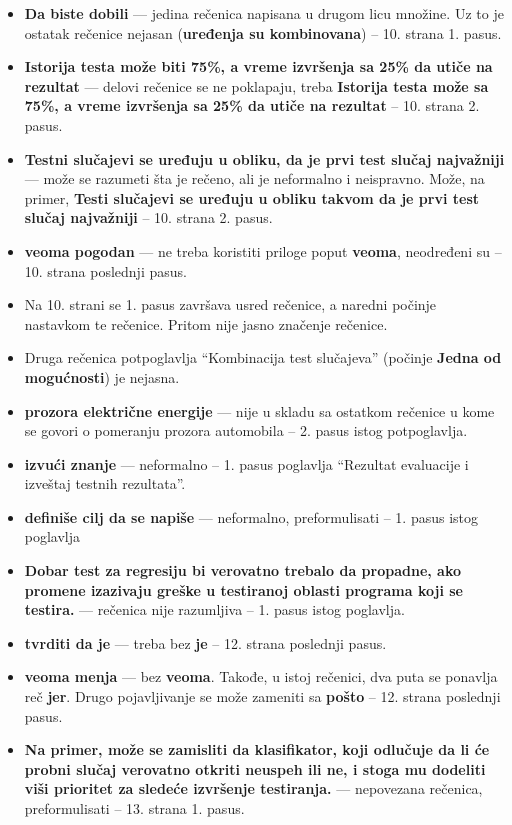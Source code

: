 \documentclass[a4paper]{report}
\begin{document}
\begin{itemize}
\item {\bf{Da biste dobili}} --- jedina rečenica napisana u drugom licu množine. Uz to je ostatak rečenice nejasan ({\bf{uređenja su kombinovana}}) -- 10. strana 1. pasus.
\item {\bf{Istorija testa može biti 75\%, a vreme izvršenja sa 25\% da utiče na rezultat}} --- delovi rečenice se ne poklapaju, treba {\bf{Istorija testa može sa 75\%, a vreme izvršenja sa 25\% da utiče na rezultat}} -- 10. strana 2. pasus.
\item {\bf{Testni slučajevi se uređuju u obliku, da je prvi test slučaj najvažniji}} --- može se razumeti šta je rečeno, ali je neformalno i neispravno. Može, na primer, {\bf{Testi slučajevi se uređuju u obliku takvom da je prvi test slučaj najvažniji}} -- 10. strana 2. pasus.
\item {\bf{veoma pogodan}} --- ne treba koristiti priloge poput {\bf{veoma}}, neodređeni su -- 10. strana poslednji pasus.
\item Na 10. strani se 1. pasus završava usred rečenice, a naredni počinje nastavkom te rečenice. Pritom nije jasno značenje rečenice.
\item Druga rečenica potpoglavlja ``Kombinacija test slučajeva'' (počinje {\bf{Jedna od mogućnosti}}) je nejasna.
\item {\bf{prozora električne energije}} --- nije u skladu sa ostatkom rečenice u kome se govori o pomeranju prozora automobila -- 2. pasus istog potpoglavlja.
\item {\bf{izvući znanje}} --- neformalno -- 1. pasus poglavlja ``Rezultat evaluacije i izveštaj testnih rezultata''.
\item {\bf{definiše cilj da se napiše}} --- neformalno, preformulisati -- 1. pasus istog poglavlja
\item {\bf{Dobar test za regresiju bi verovatno trebalo da propadne, ako promene izazivaju greške u testiranoj oblasti programa koji se testira.}} --- rečenica nije razumljiva -- 1. pasus istog poglavlja.
\item {\bf{tvrditi da je}} --- treba bez {\bf{je}} -- 12. strana poslednji pasus.
\item {\bf{veoma menja}} --- bez {\bf{veoma}}. Takođe, u istoj rečenici, dva puta se ponavlja reč {\bf{jer}}. Drugo pojavljivanje se može zameniti sa {\bf{pošto}} -- 12. strana poslednji pasus.
\item {\bf{Na primer, može se zamisliti da klasifikator, koji odlučuje da li će probni slučaj verovatno otkriti neuspeh ili ne, i stoga mu dodeliti viši prioritet za sledeće izvršenje testiranja.}} --- nepovezana rečenica, preformulisati -- 13. strana 1. pasus.

\end{itemize}
\end{document}
